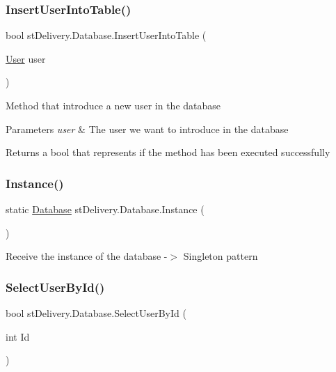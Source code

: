 \subsubsection{\texorpdfstring{Insert\+User\+Into\+Table()}{InsertUserIntoTable()}}
{\footnotesize\ttfamily bool st\+Delivery.\+Database.\+Insert\+User\+Into\+Table (\begin{DoxyParamCaption}\item[{\hyperlink{classst_delivery_1_1_user}{User}}]{user }\end{DoxyParamCaption})}



Method that introduce a new user in the database 


\begin{DoxyParams}{Parameters}
{\em user} & The user we want to introduce in the database\\
\hline
\end{DoxyParams}
\begin{DoxyReturn}{Returns}
a bool that represents if the method has been executed successfully
\end{DoxyReturn}
\mbox{\label{classst_delivery_1_1_database_a460aa2a51464b7f4c098ba1e8a2aa213}} 
\subsubsection{\texorpdfstring{Instance()}{Instance()}}
{\footnotesize\ttfamily static \hyperlink{classst_delivery_1_1_database}{Database} st\+Delivery.\+Database.\+Instance (\begin{DoxyParamCaption}{ }\end{DoxyParamCaption})\hspace{0.3cm}{\ttfamily [static]}}



Receive the instance of the database -\/$>$ Singleton pattern 

\mbox{\label{classst_delivery_1_1_database_a44f6c1008ab4a8c9cc778e424aa23290}} 
\subsubsection{\texorpdfstring{Select\+User\+By\+Id()}{SelectUserById()}}
{\footnotesize\ttfamily bool st\+Delivery.\+Database.\+Select\+User\+By\+Id (\begin{DoxyParamCaption}\item[{int}]{Id }\end{DoxyParamCaption})}



